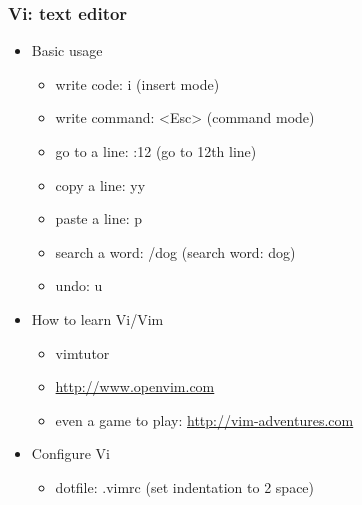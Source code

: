 \documentclass{beamer}
\begin{document}
	\begin{frame}
		\frametitle{Vi: text editor}
		
		\begin{itemize}
			\item \small Basic usage
			\begin{itemize}
				\item \small write code: i (insert mode)
				\item \small write command: <Esc> (command mode)
				\item \small go to a line: :12 (go to 12th line)
				\item \small copy a line: yy
				\item \small paste a line: p
				\item \small search a word: /dog (search word: dog)
				\item \small undo: u
			\end{itemize} 
      \item \small How to learn Vi/Vim
      \begin{itemize}
        \item \small vimtutor
				\item \small \url{http://www.openvim.com}
				\item \small even a game to play: \url{http://vim-adventures.com}
      \end{itemize}
      \item \small Configure Vi
      \begin{itemize}
				\item \small dotfile: .vimrc (set indentation to 2 space)
			\end{itemize}
    \end{itemize}
  \end{frame}
\end{document}
